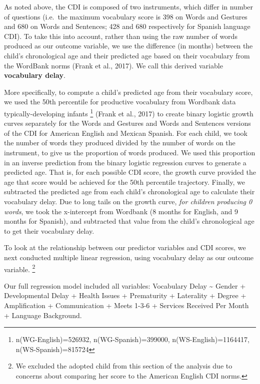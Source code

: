\documentclass[english,man]{apa6}
\begin{document}
As noted above, the CDI is composed of two instruments, which differ in number of questions (i.e.~the maximum vocabulary score is 398 on Words and Gestures and 680 on Words and Sentences; 428 and 680 respectively for Spanish language CDI). To take this into account, rather than using the raw number of words produced as our outcome variable, we use the difference (in months) between the child's chronological age and their predicted age based on their vocabulary from the WordBank norms (Frank et al., 2017). We call this derived variable \textbf{vocabulary delay}.

More specifically, to compute a child's predicted age from their vocabulary score, we used the 50th percentile for productive vocabulary from Wordbank data typically-developing infants \footnote{n(WG-English)=526932, n(WG-Spanish)=399000, n(WS-English)=1164417, n(WS-Spanish)=815724} (Frank et al., 2017) to create binary logistic growth curves separately for the Words and Gestures and Words and Sentences versions of the CDI for American English and Mexican Spanish. For each child, we took the number of words they produced divided by the number of words on the instrument, to give us the proportion of words produced. We used this proportion in an inverse prediction from the binary logistic regression curves to generate a predicted age. That is, for each possible CDI score, the growth curve provided the age that score would be achieved for the 50th percentile trajectory. Finally, we subtracted the predicted age from each child's chronological age to calculate their vocabulary delay. Due to long tails on the growth curve, \emph{for children producing 0 words}, we took the x-intercept from Wordbank (8 months for English, and 9 months for Spanish), and subtracted that value from the child's chronological age to get their vocabulary delay.

To look at the relationship between our predictor variables and CDI scores, we next conducted multiple linear regression, using vocabulary delay as our outcome variable. \footnote{We excluded the adopted child from this section of the analysis due to concerns about comparing her score to the American English CDI norms.}

Our full regression model included all variables: Vocabulary Delay \textasciitilde{} Gender + Developmental Delay + Health Issues + Prematurity + Laterality + Degree + Amplification + Communication + Meets 1-3-6 + Services Received Per Month + Language Background.
\end{document}
